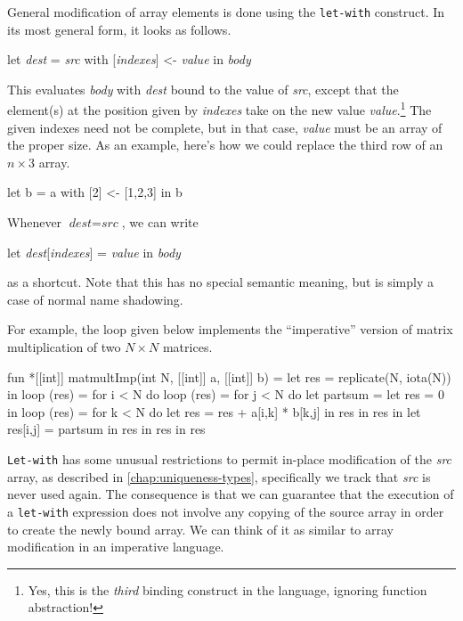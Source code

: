 General modification of array elements is done using the
\texttt{let-with} construct.  In its most general form, it looks as
follows.
\begin{colorcode}
  let \textit{dest} = \textit{src} with [\textit{indexes}] <- \textit{value}
  in \textit{body}
\end{colorcode}
This evaluates \textit{body} with \textit{dest} bound to the value of
\textit{src}, except that the element(s) at the position given by
\textit{indexes} take on the new value \textit{value}.\footnote{Yes,
  this is the \emph{third} binding construct in the language, ignoring
  function abstraction!}  The given indexes need not be complete, but
in that case, \textit{value} must be an array of the proper size.  As
an example, here's how we could replace the third row of an $n\times3$
array.
\begin{colorcode}
  let b = a with [2] <- [1,2,3] in b
\end{colorcode}
Whenever $\textit{dest} = \textit{src}$, we can write
\begin{colorcode}
  let \textit{dest}[\textit{indexes}] = \textit{value} in \textit{body}
\end{colorcode}
as a shortcut.  Note that this has no special semantic meaning, but is
simply a case of normal name shadowing.

For example, the loop given below implements the ``imperative''
version of matrix multiplication of two $N\times N$ matrices.

\begin{colorcode}
fun *[[int]] matmultImp(int N, [[int]] a, [[int]] b) =
    let res = replicate(N, iota(N)) in
    loop (res) = for i < N do
        loop (res) = for j < N do
            let partsum =
                let res = 0 in
                loop (res) = for k < N do
                    let res = res + a[i,k] * b[k,j]
                    in  res
                in res
            in let res[i,j] = partsum in res
        in res
    in res
\end{colorcode}

\texttt{Let-with} has some unusual restrictions to permit in-place
modification of the \textit{src} array, as described in
\cref{chap:uniqueness-types}, specifically we track that \textit{src}
is never used again.  The consequence is that we can guarantee that
the execution of a \texttt{let-with} expression does not involve any
copying of the source array in order to create the newly bound array.
We can think of it as similar to array modification in an imperative
language.

